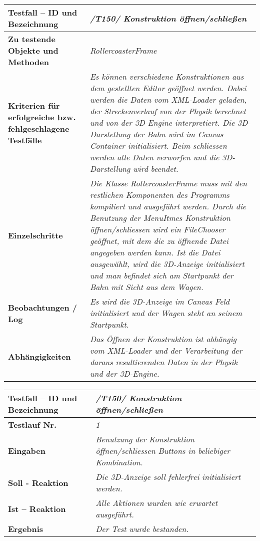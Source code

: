 \begin{longtable}{|p{7cm}|p{10cm}|}
\hline
\textbf{Testfall -- ID und Bezeichnung} &  \textit{/T150/ Konstruktion öffnen/schließen } \\
\hline
\textbf{Zu testende Objekte und Methoden} &  \textit{RollercoasterFrame}
\\
\hline
\textbf{Kriterien für erfolgreiche bzw. fehlgeschlagene Testfälle} &
\textit{Es können verschiedene Konstruktionen aus dem gestellten Editor geöffnet werden. Dabei werden die Daten vom XML-Loader geladen, der Streckenverlauf von der Physik berechnet
 und von der 3D-Engine interpretiert. Die 3D-Darstellung der Bahn wird im Canvas Container initialisiert. Beim schliessen werden alle Daten verworfen und die 3D-Darstellung wird beendet.} \\
\hline
\textbf{Einzelschritte} &  \textit{Die Klasse RollercoasterFrame muss mit den restlichen Komponenten des Programms kompiliert und ausgeführt werden. Durch die Benutzung der MenuItmes
Konstruktion öffnen/schliessen wird ein FileChooser geöffnet, mit dem die zu öffnende Datei angegeben werden kann. Ist die Datei ausgewählt, wird die 3D-Anzeige initialisiert und man befindet
sich am Startpunkt der Bahn mit Sicht aus dem Wagen.} \\
\hline
\textbf{Beobachtungen / Log} &  \textit{Es wird die 3D-Anzeige im Canvas Feld initialisiert und der Wagen steht an seinem Startpunkt.} \\
\hline
\textbf{Abhängigkeiten} &  \textit{Das Öffnen der Konstruktion ist abhängig vom XML-Loader und der Verarbeitung der daraus resultierenden Daten in der Physik und der 3D-Engine.} \\
\hline
 \end{longtable}


\begin{longtable}{|p{7cm}|p{10cm}|}
\hline
\textbf{Testfall -- ID und Bezeichnung} & \textit{/T150/ Konstruktion öffnen/schließen} \\
\hline
\textbf{Testlauf Nr.} & \textit{1} \\
\hline
\textbf{Eingaben} & \textit{Benutzung der Konstruktion öffnen/schliessen Buttons in beliebiger Kombination.} \\
\hline
\textbf{Soll - Reaktion} & \textit{ Die 3D-Anzeige soll fehlerfrei initialisiert werden.} \\
\hline
\textbf{Ist -- Reaktion} & \textit{ Alle Aktionen wurden wie erwartet ausgeführt.} \\
\hline
\textbf{Ergebnis} & \textit{Der Test wurde bestanden.} \\
\hline
 \end{longtable}




